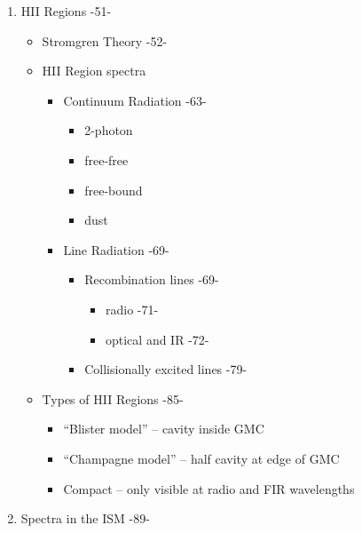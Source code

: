 \documentclass{article}
\begin{document}
\begin{enumerate}[label=\Roman*.]
\newpage
\item HII Regions -51-
\begin{itemize}
    \item Stromgren Theory -52-
    \item HII Region spectra
    \begin{itemize}
        \item Continuum Radiation -63-
        \begin{itemize}
            \item 2-photon
            \item free-free
            \item free-bound
            \item dust
        \end{itemize}
        \item Line Radiation -69-
        \begin{itemize}
            \item Recombination lines -69-
            \begin{itemize}
                \item radio -71-
                \item optical and IR -72-
            \end{itemize}
            \item Collisionally excited lines -79-
        \end{itemize}
    \end{itemize}
\item Types of HII Regions -85-
    \begin{itemize}
        \item ``Blister model'' -- cavity inside GMC
        \item ``Champagne model'' -- half cavity at edge of GMC
        \item Compact -- only visible at radio and FIR wavelengths
    \end{itemize}
\end{itemize}

\item Spectra in the ISM -89-
\begin{itemize}


\end{itemize}
\end{enumerate}
\end{document}
